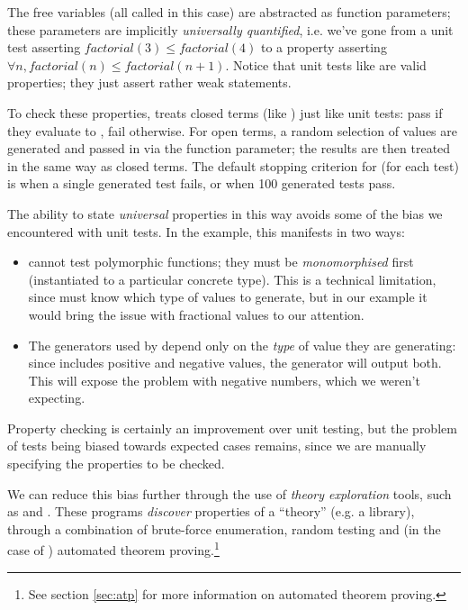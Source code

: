 The free variables (all called  in this case) are abstracted as function parameters; these parameters are implicitly \emph{universally quantified}, i.e. we've gone from a unit test asserting $factorial(3) \leq factorial(4)$ to a property asserting $\forall n, factorial(n) \leq factorial(n+1)$. Notice that unit tests like  are valid properties; they just assert rather weak statements.

To check these properties, \qcheck{} treats closed terms (like ) just like unit tests: pass if they evaluate to , fail otherwise. For open terms, a random selection of values are generated and passed in via the function parameter; the results are then treated in the same way as closed terms. The default stopping criterion for \qcheck{} (for each test) is when a single generated test fails, or when 100 generated tests pass.

The ability to state \emph{universal} properties in this way avoids some of the bias we encountered with unit tests. In the  example, this manifests in two ways:

\begin{itemize}
  \item \qcheck{} cannot test polymorphic functions; they must be \emph{monomorphised} first (instantiated to a particular concrete type). This is a technical limitation, since \qcheck{} must know which type of values to generate, but in our example it would bring the issue with fractional values to our attention.

  \item The generators used by \qcheck{} depend only on the \emph{type} of value they are generating: since  includes positive and negative values, the  generator will output both. This will expose the problem with negative numbers, which we weren't expecting.
\end{itemize}

Property checking is certainly an improvement over unit testing, but the problem of tests being biased towards expected cases remains, since we are manually specifying the properties to be checked.

We can reduce this bias further through the use of \emph{theory exploration} tools, such as \qspec{} and \hspec{}. These programs \emph{discover} properties of a ``theory'' (e.g. a library), through a combination of brute-force enumeration, random testing and (in the case of \hspec{}) automated theorem proving.\footnote{See section \ref{sec:atp} for more information on automated theorem proving.}

